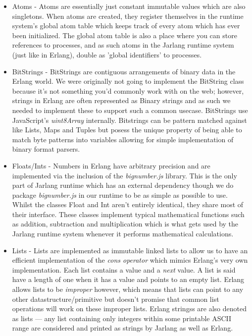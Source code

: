 \documentclass[twoside,12pt,titlepage,a4paper]{article}
\begin{document}
\begin{itemize}
	\item Atoms - Atoms are essentially just constant immutable values which are also singletons. When atoms are created, they register themselves in the runtime system's global atom table which keeps track of every atom which has ever been initialized. The global atom table is also a place where you can store references to processes, and as such atoms in the Jarlang runtime system (just like in Erlang), double as 'global identifiers' to processes.
			
	\item BitStrings - BitStrings are contiguous arrangements of binary data in the Erlang world. We were originally not going to implement the BitString class because it's not something you'd commonly work with on the web; however, strings in Erlang are often represented as Binary strings and as such we needed to implement these to support such a common usecase. BitStrings use JavaScript's \textit{uint8Array} internally. Bitstrings can be pattern matched against like Lists, Maps and Tuples but posess the unique property of being able to match byte patterns into variables allowing for simple implementation of binary format parsers.
			
	\item Floats/Ints - Numbers in Erlang have arbitrary precision and are implemented via the inclusion of the \textit{bignumber.js} library. This is the only part of Jarlang runtime which has an external dependency though we do package \textit{bignumber.js} in our runtime to be as simple as possible to use. Whilst the classes Float and Int aren't entirely identical, they share most of their interface. These classes implement typical mathematical functions such as addition, subtraction and multiplication which is what gets used by the Jarlang runtime system whenever it performs mathematical calculations.
			
	\item Lists - Lists are implemented as immutable linked lists to allow us to have an efficient implementation of the \textit{cons operator} which mimics Erlang's very own implementation. Each list contains a value and a \textit{next} value. A list is said have a length of one when it has a value and points to an empty list. Erlang allows lists to be \textit{improper} however, which means that lists can point to any other datastructure/primitive but doesn't promise that common list operations will work on these improper lists. Erlang stringss are also denoted as lists --- any list containing only integers within some printable ASCII range are considered and printed as strings by Jarlang as well as Erlang.
			

\end{itemize}
\end{document}
